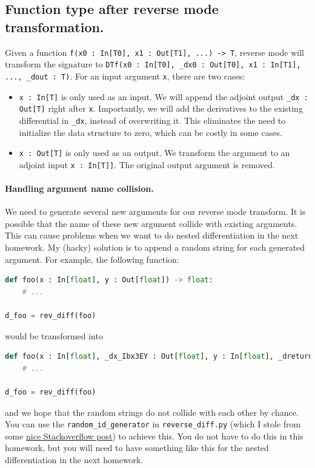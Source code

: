 \subsection{Function type after reverse mode transformation.}
\label{sec:reversemodespec}

Given a function \lstinline{f(x0 : In[T0], x1 : Out[T1], ...) -> T}, reverse mode will transform the signature to \lstinline{DTf(x0 : In[T0], _dx0 : Out[T0], x1 : In[T1], ..., _dout : T)}. For an input argument \lstinline{x}, there are two cases:
\begin{itemize}
	\item \lstinline{x : In[T]} is only used as an input. We will append the adjoint output \lstinline{_dx : Out[T]} right after \lstinline{x}. Importantly, we will add the derivatives to the existing differential in \lstinline{_dx}, instead of overwriting it. This eliminates the need to initialize the data structure to zero, which can be costly in some cases.
	\item \lstinline{x : Out[T]} is only used as an output. We transform the argument to an adjoint input \lstinline{x : In[T]]}. The original output argument is removed.
\end{itemize}

\paragraph{Handling argument name collision.} We need to generate several new arguments for our reverse mode transform. It is possible that the name of these new argument collide with existing arguments. This can cause problems when we want to do nested differentiation in the next homework. My (hacky) solution is to append a random string for each generated argument. For example, the following function:
\begin{lstlisting}[language=Python]
def foo(x : In[float], y : Out[float]) -> float:
    # ...

d_foo = rev_diff(foo)
\end{lstlisting}
would be transformed into
\begin{lstlisting}[language=Python]
def foo(x : In[float], _dx_Ibx3EY : Out[float], y : In[float], _dreturn_W7TFYQ : In[float]):
    # ...

d_foo = rev_diff(foo)
\end{lstlisting}
and we hope that the random strings do not collide with each other by chance. You can use the \lstinline{random_id_generator} in \lstinline{reverse_diff.py} (which I stole from some \href{https://stackoverflow.com/questions/2257441/random-string-generation-with-upper-case-letters-and-digits}{nice Stackoverflow post}) to achieve this. You do not have to do this in this homework, but you will need to have something like this for the nested differentiation in the next homework.

